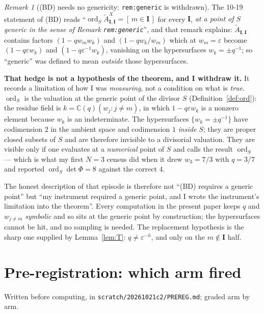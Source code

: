 \documentclass[11pt]{article}
\theoremstyle{definition}
\theoremstyle{remark}
\newtheorem{rem}[thm]{Remark}
\DeclareMathOperator{\ord}{ord}
\newcommand{\At}{\widetilde{A}}
\newcommand{\bI}{\mathbf{I}}
\begin{document}
\begin{rem}[(BD) needs no genericity: \texttt{rem:generic} is withdrawn]
\label{rem:retract}
The 10-19 statement of (BD) reads ``$\ord_S\At^{X}_{\bI,\bI}=[\,m\in\bI\,]$ for every
$\bI$, \emph{at a point of $S$ generic in the sense of Remark \texttt{rem:generic}}'', and
that remark explains: $\At_{\bI,\bI}$ contains factors $(1-qw_mw_k)$ and $(1-qw_k/w_m)$
which at $w_m=\varepsilon$ become $(1-q\varepsilon w_k)$ and
$(1-q\varepsilon^{-1}w_k)$, vanishing on the hypersurfaces $w_k=\pm q^{-1}$; so
``generic'' was defined to mean \emph{outside} those hypersurfaces.

\textbf{That hedge is not a hypothesis of the theorem, and I withdraw it.}  It records a
limitation of how I was \emph{measuring}, not a condition on what is \emph{true}.
$\ord_S$ is the valuation at the generic point of the divisor $S$
(Definition~\ref{def:ord}): the residue field is $k=\mathbb{C}(q)(w_j:j\ne m)$, in which
$1-q\varepsilon w_k$ is a nonzero element because $w_k$ is an indeterminate.  The
hypersurfaces $\{w_k=\pm q^{-1}\}$ have codimension $2$ in the ambient space and
codimension $1$ \emph{inside} $S$; they are proper closed subsets of $S$ and are
therefore invisible to a divisorial valuation.  They are visible only if one evaluates
at a \emph{numerical} point of $S$ and calls the result $\ord_S$ --- which is what my
first $N=3$ census did when it drew $w_3=7/3$ with $q=3/7$ and reported
$\ord_S\det\Phi=8$ against the correct $4$.

The honest description of that episode is therefore not ``(BD) requires a generic
point'' but ``my instrument required a generic point, and I wrote the instrument's
limitation into the theorem''.  Every computation in the present paper keeps $q$ and
$w_{j\ne m}$ \emph{symbolic} and so sits at the generic point by construction; the
hypersurfaces cannot be hit, and no sampling is needed.  The replacement hypothesis is
the sharp one supplied by Lemma~\ref{lem:T}: $q\ne\varepsilon^{-h}$, and only on the
$m\notin\bI$ half.
\end{rem}

\section{Pre-registration: which arm fired}
\label{sec:prereg}

Written before computing, in
\texttt{scratch/20261021c2/PREREG.md}; graded arm by arm.
\end{document}
